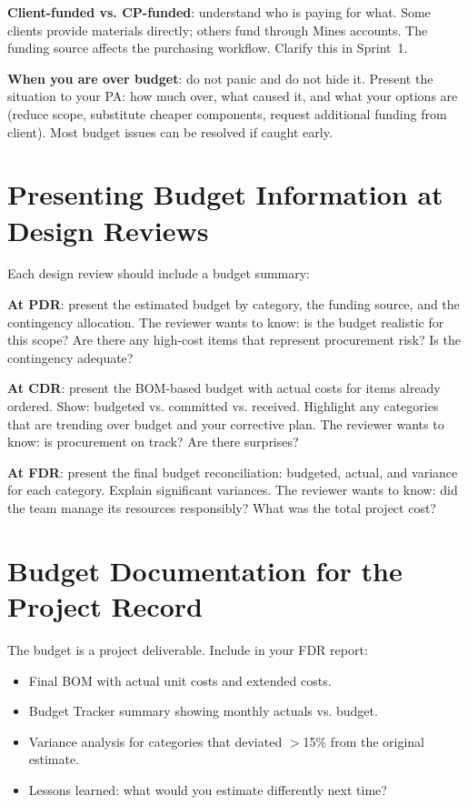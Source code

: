 \textbf{Client-funded vs. CP-funded}: understand who is paying for what. Some clients provide materials directly; others fund through Mines accounts. The funding source affects the purchasing workflow. Clarify this in Sprint~1.

\textbf{When you are over budget}: do not panic and do not hide it. Present the situation to your PA: how much over, what caused it, and what your options are (reduce scope, substitute cheaper components, request additional funding from client). Most budget issues can be resolved if caught early.



\section{Presenting Budget Information at Design Reviews}
Each design review should include a budget summary:

\textbf{At PDR}: present the estimated budget by category, the funding source, and the contingency allocation. The reviewer wants to know: is the budget realistic for this scope? Are there any high-cost items that represent procurement risk? Is the contingency adequate?

\textbf{At CDR}: present the BOM-based budget with actual costs for items already ordered. Show: budgeted vs. committed vs. received. Highlight any categories that are trending over budget and your corrective plan. The reviewer wants to know: is procurement on track? Are there surprises?

\textbf{At FDR}: present the final budget reconciliation: budgeted, actual, and variance for each category. Explain significant variances. The reviewer wants to know: did the team manage its resources responsibly? What was the total project cost?

\section{Budget Documentation for the Project Record}
The budget is a project deliverable. Include in your FDR report:
\begin{itemize}[nosep,leftmargin=1.5em]
\item Final BOM with actual unit costs and extended costs.
\item Budget Tracker summary showing monthly actuals vs. budget.
\item Variance analysis for categories that deviated $>$15\% from the original estimate.
\item Lessons learned: what would you estimate differently next time?
\end{itemize}

